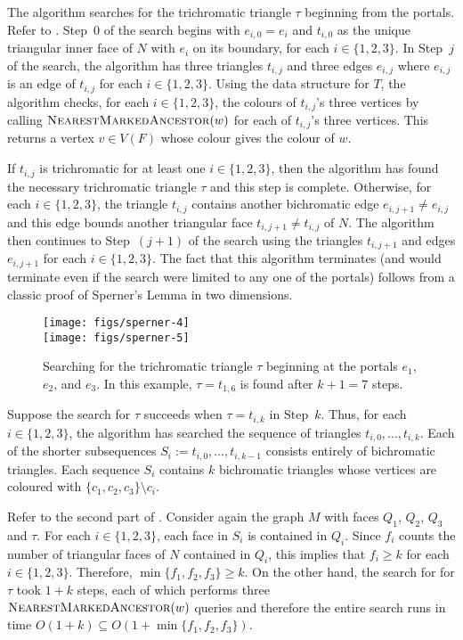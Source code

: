 \documentclass[kpfonts]{patmorin}
\let\ge\geqslant
\begin{document}
The algorithm searches for the trichromatic triangle $\tau$ beginning from the portals.  Refer to . Step~0 of the search begins with $e_{i,0}=e_i$ and $t_{i,0}$ as the unique triangular inner face of $N$ with $e_i$ on its boundary, for each $i\in\{1,2,3\}$. In Step~$j$ of the search, the algorithm has three triangles $t_{i,j}$ and three edges $e_{i,j}$ where $e_{i,j}$ is an edge of $t_{i,j}$ for each $i\in\{1,2,3\}$.  Using the data structure for $T$, the algorithm checks, for each $i\in\{1,2,3\}$, the colours of $t_{i,j}$'s three vertices by calling $\textsc{NearestMarkedAncestor}(w)$ for each of $t_{i,j}$'s three vertices.  This returns a vertex $v\in V(F)$ whose colour gives the colour of $w$.

If $t_{i,j}$ is trichromatic for at least one $i\in\{1,2,3\}$, then the algorithm has found the necessary trichromatic triangle $\tau$ and this step is complete. Otherwise, for each $i\in\{1,2,3\}$, the triangle $t_{i,j}$ contains another bichromatic edge $e_{i,j+1}\neq e_{i,j}$ and this edge bounds another triangular face $t_{i,j+1}\neq t_{i,j}$ of $N$.  The algorithm then continues to Step~$(j+1)$ of the search using the triangles $t_{i,j+1}$ and edges $e_{i,j+1}$ for each $i\in\{1,2,3\}$.  The fact that this algorithm terminates (and would terminate even if the search were limited to any one of the portals) follows from a classic proof of Sperner's Lemma in two dimensions.

 \begin{figure}
   \begin{center}
     \texttt{[image: figs/sperner-4]} \\[1ex]
     \texttt{[image: figs/sperner-5]}
   \end{center}
   \caption{Searching for the trichromatic triangle $\tau$ beginning at the portals $e_1$, $e_2$, and $e_3$. In this example, $\tau=t_{1,6}$ is found after $k+1=7$ steps.}
 \end{figure}

Suppose the search for $\tau$ succeeds when $\tau=t_{i,k}$ in Step~$k$.  Thus, for each $i\in\{1,2,3\}$, the algorithm has searched the sequence of triangles $t_{i,0},\ldots,t_{i,k}$.  Each of the shorter subsequences $S_i:=t_{i,0},\ldots,t_{i,k-1}$ consists entirely of bichromatic triangles. Each sequence $S_i$ contains $k$ bichromatic triangles whose vertices are coloured with $\{c_1,c_2,c_3\}\setminus c_i$.

Refer to the second part of . Consider again the graph $M$ with faces $Q_1$, $Q_2$, $Q_3$ and $\tau$. For each $i\in\{1,2,3\}$, each face in $S_i$ is contained in $Q_i$.  Since $f_i$ counts the number of triangular faces of $N$ contained in $Q_i$, this implies that $f_i\ge k$ for each $i\in \{1,2,3\}$.  Therefore, $\min\{f_1,f_2,f_3\}\ge k$.  On the other hand, the search for for $\tau$ took $1+k$ steps, each of which performs three $\textsc{NearestMarkedAncestor}(w)$ queries and therefore the entire search runs in time $O(1+k) \subseteq O(1+\min\{f_1,f_2,f_3\})$.
\end{document}
